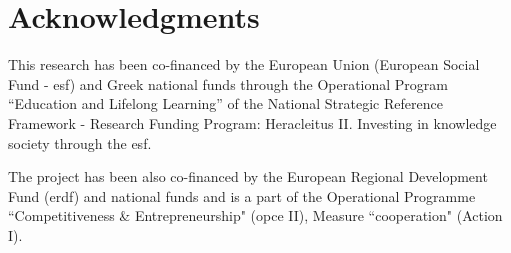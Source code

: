 \documentclass{sig-alternate}
\begin{document}
\section{Acknowledgments}
This research has been co-financed by the European Union (European Social Fund
- {\sc esf}) and Greek national funds through the Operational Program
``Education and Lifelong Learning'' of the National Strategic Reference Framework -
Research Funding Program: Heracleitus II. Investing in knowledge society
through the {\sc esf}.

The project has been also co-financed by the European Regional Development Fund ({\sc erdf})
and national funds and is a part of the Operational Programme ``Competitiveness \&
Entrepreneurship" ({\sc opce} II), Measure ``{\sc cooperation}" (Action I).


  
\end{document}
